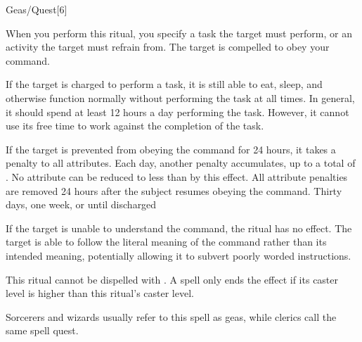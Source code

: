 \begin{spellsection}{Geas/Quest}[6]
    \begin{spellheader}
    \end{spellheader}
    \begin{spellcontent}
        \begin{spelltargetinginfo}
            \spellrng{\rngmed}
        \end{spelltargetinginfo}
        \begin{spelleffects}

            \spelleffect When you perform this ritual, you specify a task the target must perform, or an activity the target must refrain from. The target is compelled to obey your command.

            If the target is charged to perform a task, it is still able to eat, sleep, and otherwise function normally without performing the task at all times. In general, it should spend at least 12 hours a day performing the task. However, it cannot use its free time to work against the completion of the task.

            \par If the target is prevented from obeying the command for 24 hours, it takes a  penalty to all attributes. Each day, another  penalty accumulates, up to a total of . No attribute can be reduced to less than  by this effect. All attribute penalties are removed 24 hours after the subject resumes obeying the command.
            \spelldur Thirty days, one week, or until discharged \dismissable
        \end{spelleffects}
    \end{spellcontent}
    \begin{spellfooter}
        \spellnotes If the target is unable to understand the command, the ritual has no effect. The target is able to follow the literal meaning of the command rather than its intended meaning, potentially allowing it to subvert poorly worded instructions.

        \par This ritual cannot be dispelled with . A  spell only ends the effect if its caster level is higher than this ritual's caster level.

        \par Sorcerers and wizards usually refer to this spell as geas, while clerics call the same spell quest.
    \end{spellfooter}
\end{spellsection}

